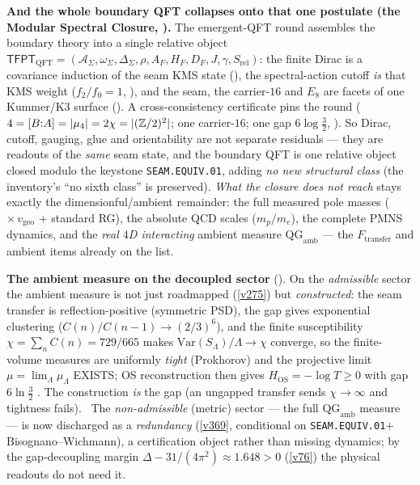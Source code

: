 \par\smallskip\noindent\textbf{And the whole boundary QFT collapses onto that one postulate (the Modular
Spectral Closure, ).} The emergent-QFT round assembles the boundary
theory into a single relative object $\mathsf{TFPT}_{\mathrm{QFT}}=(\mathcal A_\Sigma,\omega_\Sigma,
\Delta_\Sigma,\rho,A_F,H_F,D_F,J,\gamma,S_{\mathrm{rel}})$: the finite Dirac is a covariance induction of the
seam KMS state (), the spectral-action cutoff \emph{is} that KMS
weight ($f_2/f_0{=}1$, ), and the seam, the carrier-$16$ and $E_8$ are
facets of one Kummer/K3 surface (). A cross-consistency certificate
pins the round ($4=[B{:}A]=|\mu_4|=2\chi=|(\mathbb Z/2)^2|$; one carrier-$16$; one gap $6\log\tfrac32$,
). So Dirac, cutoff, gauging, glue and orientability are not
separate residuals --- they are readouts of the \emph{same} seam state, and the boundary QFT is one relative
object closed modulo the keystone \texttt{SEAM.EQUIV.01}, adding \emph{no new structural class} (the inventory's
``no sixth class'' is preserved). \emph{What the closure does \emph{not} reach} stays exactly the
dimensionful/ambient remainder: the full measured pole masses ($\times\,v_{\mathrm{geo}}$ $+$ standard RG),
the absolute QCD scales ($m_p/m_e$), the complete PMNS dynamics, and the \emph{real $4$D interacting} ambient
measure $\mathrm{QG}_{\mathrm{amb}}$ --- the $F_{\mathrm{transfer}}$ and ambient items already on the list.

\par\smallskip\noindent\textbf{The ambient measure on the decoupled sector}
(). On the \emph{admissible} sector the ambient measure is not just
roadmapped (\vref{v275}) but \emph{constructed}: the seam transfer is reflection-positive (symmetric PSD), the gap
gives exponential clustering ($C(n)/C(n{-}1)\to(2/3)^6$), and the finite susceptibility $\chi=\sum_n C(n)=729/665$
makes $\mathrm{Var}(S_\Lambda)/\Lambda\to\chi$ converge, so the finite-volume measures are uniformly \emph{tight}
(Prokhorov) and the projective limit $\mu=\lim_\Lambda\mu_\Lambda$ EXISTS; OS reconstruction then gives
$H_{\mathrm{OS}}{=}-\log T\ge0$ with gap $6\ln\tfrac32$ \mE. The construction \emph{is} the gap (an ungapped
transfer sends $\chi\to\infty$ and tightness fails). \mC\ The \emph{non-admissible}
(metric) sector --- the full $\mathrm{QG}_{\mathrm{amb}}$ measure --- is now discharged as a \emph{redundancy}
(\vref{v369}, conditional on \texttt{SEAM.EQUIV.01}${+}$Bisognano--Wichmann), a certification object rather than
missing dynamics; by the gap-decoupling margin $\Delta-31/(4\pi^2)\approx1.648>0$ (\vref{v76}) the physical readouts
do not need it.


